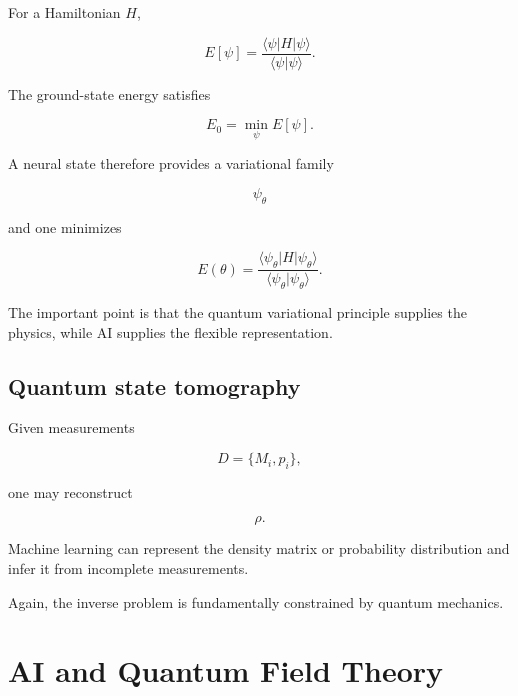 \documentclass[11pt,a4paper,oneside]{book}
\begin{document}
For a Hamiltonian $H$,

\begin{equation}
E[\psi]
=
\frac{
\langle\psi|H|\psi\rangle
}{
\langle\psi|\psi\rangle
}.
\end{equation}

The ground-state energy satisfies

\begin{equation}
E_0
=
\min_\psi E[\psi].
\end{equation}

A neural state therefore provides a variational family

\begin{equation}
\psi_\theta
\end{equation}

and one minimizes

\begin{equation}
E(\theta)
=
\frac{
\langle\psi_\theta|H|\psi_\theta\rangle
}{
\langle\psi_\theta|\psi_\theta\rangle
}.
\end{equation}

The important point is that the quantum variational principle supplies the
physics, while AI supplies the flexible representation.

\section{Quantum state tomography}

Given measurements

\begin{equation}
D=\{M_i,p_i\},
\end{equation}

one may reconstruct

\begin{equation}
\rho.
\end{equation}

Machine learning can represent the density matrix or probability distribution
and infer it from incomplete measurements.

Again, the inverse problem is fundamentally constrained by quantum mechanics.

\chapter{AI and Quantum Field Theory}
\end{document}
